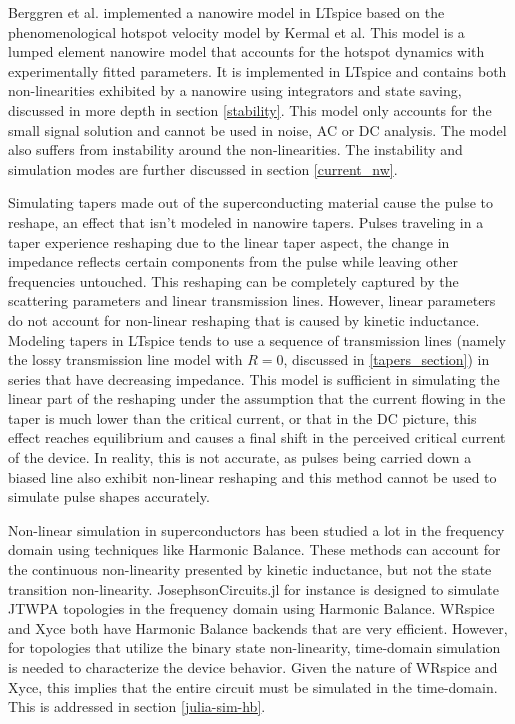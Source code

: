 \documentclass{article}
\newcommand{\todoref}[2][]{\todo[color=cyan!40, #1]{\textbf{add ref:}\\#2}}
\begin{document}
Berggren et al. implemented a nanowire model in LTspice based on the phenomenological hotspot 
velocity model by Kermal et al. This model is a lumped element nanowire model that accounts 
for the hotspot dynamics with experimentally fitted parameters. It is implemented in LTspice
and contains both non-linearities exhibited by a nanowire using integrators and state saving,
discussed in more depth in section \ref{stability}.\todoref[]{karl spice} This model only 
accounts for the small signal solution and cannot be used in noise, AC or DC analysis.
The model also suffers from instability around the non-linearities. The instability and 
simulation modes are further discussed in section \ref{current_nw}.

Simulating tapers made out of the superconducting material cause the pulse to reshape,
an effect that isn't modeled in nanowire tapers.\todoref[]{idk?} Pulses traveling
in a taper experience reshaping due to the linear taper aspect, the change in impedance
reflects certain components from the pulse while leaving other frequencies untouched.
This reshaping can be completely captured by the scattering parameters and linear 
transmission lines. However, linear parameters do not account for non-linear reshaping
that is caused by kinetic inductance. Modeling tapers in LTspice tends to use a
sequence of transmission lines (namely the lossy transmission line model with $R=0$, 
discussed in \ref{tapers_section}) in series that have decreasing impedance. This model
is sufficient in simulating the linear part of the reshaping under the assumption
that the current flowing in the taper is much lower than the critical current, or
that in the DC picture, this effect reaches equilibrium and causes a final shift in the
perceived critical current of the device. In reality, this is not accurate, as pulses
being carried down a biased line also exhibit non-linear reshaping and this method
cannot be used to simulate pulse shapes accurately.

Non-linear simulation in superconductors has been studied a lot in the frequency domain
using techniques like Harmonic Balance. These methods can account for the continuous 
non-linearity presented by kinetic inductance, but not the state transition non-linearity.
JosephsonCircuits.jl for instance is designed
to simulate JTWPA topologies in the frequency domain using Harmonic Balance. WRspice
and Xyce both have Harmonic Balance backends that are very efficient. However,
for topologies that utilize the binary state non-linearity, time-domain simulation 
is needed to characterize the device behavior. Given the nature of WRspice and Xyce,
this implies that the entire circuit must be simulated in the time-domain. This is
addressed in section \ref{julia-sim-hb}.
\end{document}
